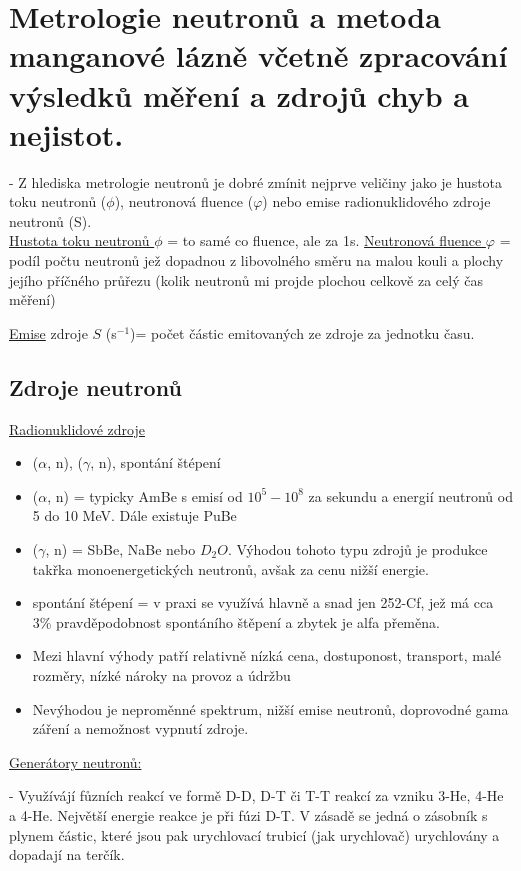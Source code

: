 \newpage
\section{Metrologie neutronů a metoda manganové lázně včetně zpracování výsledků měření a zdrojů chyb a nejistot.}

- Z hlediska metrologie neutronů je dobré zmínit nejprve veličiny jako je hustota toku neutronů ($\phi$), neutronová fluence ($\varphi$) nebo emise radionuklidového zdroje neutronů (S).
\\
\underline{Hustota toku neutronů $\phi$} = to samé co fluence, ale za 1s.
\underline{Neutronová fluence $\varphi$} = podíl počtu neutronů jež dopadnou z libovolného směru na malou kouli a plochy jejího příčného průřezu (kolik neutronů mi projde plochou celkově za celý čas měření)

\underline{Emise} zdroje $S$ (s$^{-1}$)= počet částic emitovaných ze zdroje za jednotku času.



\subsection{Zdroje neutronů}

\underline{Radionuklidové zdroje}
\begin{itemize}
    \item ($\alpha$, n), ($\gamma$, n), spontání štépení
    \item ($\alpha$, n) = typicky AmBe s emisí od $10^5 - 10^8$ za sekundu a energií neutronů od 5 do 10 MeV. Dále existuje PuBe
    \item ($\gamma$, n) = SbBe, NaBe nebo $D_2O$. Výhodou tohoto typu zdrojů je produkce takřka monoenergetických neutronů, avšak za cenu nižší energie.
    \item spontání štépení = v praxi se využívá hlavně a snad jen 252-Cf, jež má cca 3\% pravděpodobnost spontáního štěpení a zbytek je alfa přeměna.
    \item Mezi hlavní výhody patří relativně nízká cena, dostuponost, transport, malé rozměry, nízké nároky na provoz a údržbu
    \item Nevýhodou je neproměnné spektrum, nižší emise neutronů, doprovodné gama záření a nemožnost vypnutí zdroje.
\end{itemize}

\underline{Generátory neutronů:}

- Využívájí fůzních reakcí ve formě D-D, D-T či T-T reakcí za vzniku 3-He, 4-He a 4-He. Největší energie reakce je při fúzi D-T. V zásadě se jedná o zásobník s plynem částic, které jsou pak urychlovací trubicí (jak urychlovač) urychlovány a dopadají na terčík.

